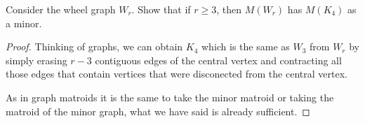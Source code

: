 \prob
{
	Consider the wheel graph $W_r$. Show that if $r \geq 3$, then $M(W_r)$ has
	$M(K_4)$ as a minor.
}
\begin{proof}
    Thinking of graphs, we can obtain $K_4$ which is the same as $W_3$ from $W_r$
    by simply erasing $r-3$ contiguous edges of the central vertex and 
    contracting all those edges that contain vertices that were disconected
    from the central vertex.\pn
    
    As in graph matroids it is the same to take the minor matroid or taking the
    matroid of the minor graph, what we have said is already sufficient.
\end{proof}